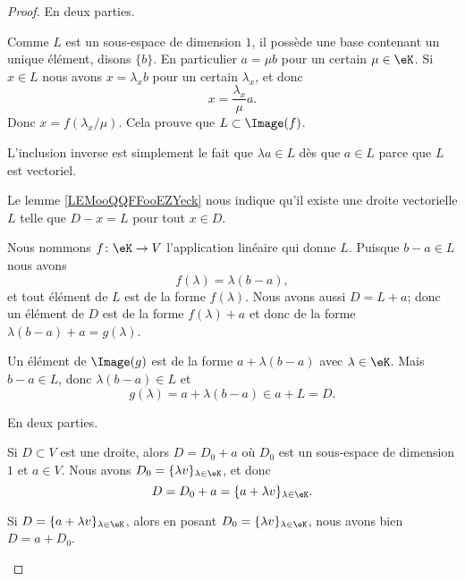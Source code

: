 \begin{proof}
	En deux parties.
	\begin{subproof}
		Comme \( L\) est un sous-espace de dimension \( 1\), il possède une base contenant un unique élément, disons \( \{ b \}\). En particulier \( a=\mu b\) pour un certain \( \mu\in \eK\). Si \( x\in L\) nous avons \( x=\lambda_x b\) pour un certain \( \lambda_x\), et donc
		\begin{equation}
			x=\frac{ \lambda_x }{ \mu }a.
		\end{equation}
		Donc \( x=f(\lambda_x/\mu)\). Cela prouve que \( L\subset\Image(f)\).

		L'inclusion inverse est simplement le fait que \( \lambda a\in L\) dès que \( a\in L\) parce que \( L\) est vectoriel.

		Le lemme \ref{LEMooQQFFooEZYeck} nous indique qu'il existe une droite vectorielle \( L\) telle que \( D-x=L\) pour tout \( x\in D\).
		\begin{subproof}
			Nous nommons \( f\colon \eK\to V\) l'application linéaire qui donne \( L\). Puisque \( b-a\in L\) nous avons
			\begin{equation}
				f(\lambda)=\lambda(b-a),
			\end{equation}
			et tout élément de \( L\) est de la forme \( f(\lambda)\). Nous avons aussi \( D=L+a\); donc un élément de \( D\) est de la forme \( f(\lambda)+a\) et donc de la forme \( \lambda(b-a)+a=g(\lambda)\).

			Un élément de \( \Image(g)\) est de la forme \( a+\lambda(b-a)\) avec \( \lambda\in \eK\). Mais \( b-a\in L\), donc \( \lambda(b-a)\in L\) et
			\begin{equation}
				g(\lambda)=a+\lambda(b-a)\in a+L=D.
			\end{equation}
		\end{subproof}

		\spitem[Pour \ref{ITEMooOKJZooIHYDIk}]
		En deux parties.
		\begin{subproof}
			\spitem[\( \Rightarrow\)]
			Si \( D\subset V\) est une droite, alors \( D=D_0+a\) où \( D_0\) est un sous-espace de dimension \( 1\) et \( a\in V\). Nous avons \( D_0=\{ \lambda v \}_{\lambda\in \eK}\), et donc
			\begin{equation}
				D=D_0+a=\{ a+\lambda v \}_{\lambda \in \eK}.
			\end{equation}

			\spitem[\( \Leftarrow\)]
			Si \( D=\{ a+\lambda v \}_{\lambda\in \eK}\), alors en posant \( D_0=\{ \lambda v \}_{\lambda\in \eK}\), nous avons bien \( D=a+D_0\).
		\end{subproof}
	\end{subproof}
\end{proof}


